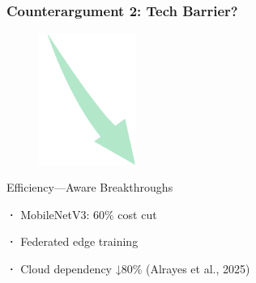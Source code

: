 \documentclass{beamer}
\begin{document}
\begin{frame}
  \frametitle{Counterargument 2: Tech Barrier?}

  \begin{figure}
    \includegraphics[width=0.28\textwidth]{figure 7.png}
    \label{fig:bigdata_conclusion}
  \end{figure}

  {\Large Efficiency---Aware Breakthroughs}
  
  \vspace{2 em}
  
  {\Large \textbf{·} MobileNetV3: 60\% cost cut}
  
  \vspace{1.5 em}
  
  {\Large \textbf{·} Federated edge training}
  
  \vspace{1.5 em}
  
  {\Large \textbf{·} Cloud dependency ↓80\%} (Alrayes et al., 2025)

\end{frame}
\end{document}
